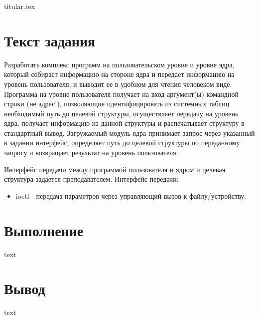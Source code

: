 \documentclass[11pt, a4paper]{article}
\begin{document}
{titular.tex}

\newpage

\section{Текст задания}
Разработать комплекс программ на пользовательском уровне и уровне ядра, который собирает информацию на стороне ядра и передает информацию на уровень пользователя, и выводит ее в удобном для чтения человеком виде. Программа на уровне пользователя получает на вход аргумент(ы) командной строки (не адрес!), позволяющие идентифицировать из системных таблиц необходимый путь до целевой структуры, осуществляет передачу на уровень ядра, получает информацию из данной структуры и распечатывает структуру в стандартный вывод. Загружаемый модуль ядра принимает запрос через указанный в задании интерфейс, определяет путь до целевой структуры по переданному запросу и возвращает результат на уровень пользователя.

\bigskip
\noindent
Интерфейс передачи между программой пользователя и ядром и целевая структура задается преподавателем. Интерфейс передачи:

\begin{itemize}
  \item ioctl - передача параметров через управляющий вызов к файлу/устройству.
\end{itemize}

\section{Выполнение}
text

\section{Вывод}
text
\end{document}

